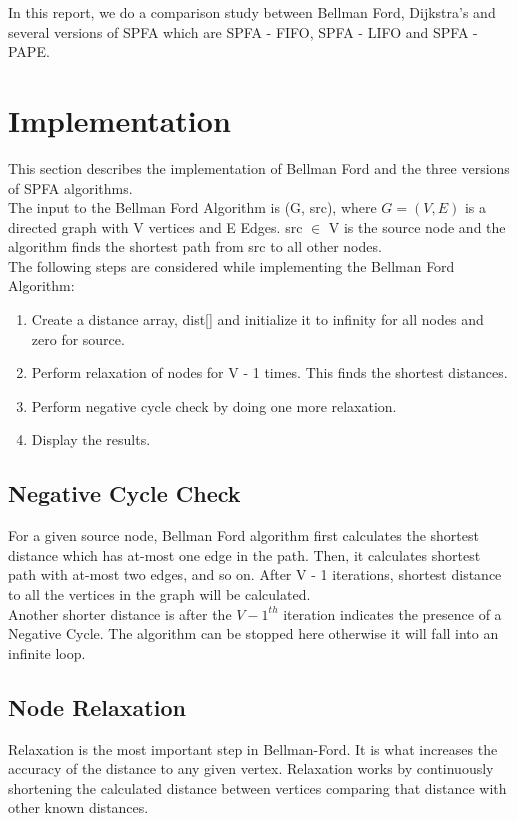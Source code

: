 \documentclass[12pt]{article}
\begin{document}
In this report, we do a comparison study between Bellman Ford, Dijkstra's and several versions of SPFA which are SPFA - FIFO, SPFA - LIFO and SPFA - PAPE. \\

\section{Implementation}
\label{sec:impl}
This section describes the implementation of Bellman Ford and the three versions of SPFA algorithms. \\

The input to the Bellman Ford Algorithm is (G, src), where $G = (V, E)$ is a directed graph with V vertices and E Edges. src $\in$ V is the source node and the algorithm finds the shortest path from src to all other nodes. \\  

The following steps are considered while implementing the Bellman Ford Algorithm:
\begin{enumerate}
	\item Create a distance array, dist[] and initialize it to infinity for all nodes and zero for source. 
	
	\item Perform relaxation of nodes for V - 1 times. This finds the shortest distances. 
	
	\item Perform negative cycle check by doing one more relaxation. 
	
	\item Display the results.  
\end{enumerate}

\subsection{Negative Cycle Check}
For a given source node, Bellman Ford algorithm first calculates the shortest distance which has at-most one edge in the path. Then, it calculates shortest path with at-most two edges, and so on. After V - 1 iterations, shortest distance to all the vertices in the graph will be calculated. \\ 
Another shorter distance is after the $V - 1^{th}$ iteration indicates the presence of a Negative Cycle. The algorithm can be stopped here otherwise it will fall into an infinite loop. \\

\subsection{Node Relaxation}
Relaxation is the most important step in Bellman-Ford. It is what increases the accuracy of the distance to any given vertex. Relaxation works by continuously shortening the calculated distance between vertices comparing that distance with other known distances. \\
\end{document}
